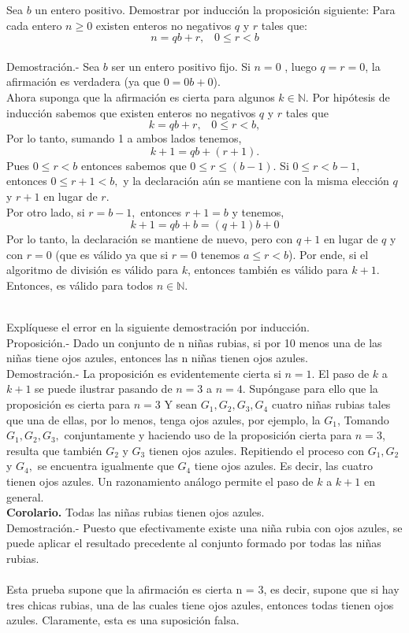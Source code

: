 \begin{ej}
Sea $b$ un entero positivo. Demostrar por inducción la proposición siguiente: Para cada entero $n\geq 0$ existen enteros no negativos $q$ \; y \; $r$ tales que:
$$n=qb+r, \; \; \; 0\leq r < b$$ \\
Demostración.- \; Sea $b$ ser un entero positivo fijo. Si $n=0$ , luego $q=r=0$, la afirmación es verdadera (ya que $0=0b+0$).\\
Ahora suponga que la afirmación es cierta para algunos $k \in \mathbb{N}$. Por hipótesis de inducción sabemos que existen enteros no negativos $q$ \; y \; $r$ tales que $$k=qb+r, \; \; \; 0\leq r < b,$$ Por lo tanto, sumando 1 a ambos lados tenemos, $$k+1=qb+(r+1).$$ Pues $0\leq r < b$ entonces sabemos que $0\leq r \leq (b-1)$. Si $0\leq r < b-1,$ entonces $0\leq r+1<b,$ y la declaración aún se mantiene con la misma elección $q$ \; y \; $r+1$ en lugar de $r$.\\
Por otro lado, si $r=b-1,$ entonces $r+1=b$ y tenemos, $$k+1=qb+b=(q+1)b+0$$
Por lo tanto, la declaración se mantiene de nuevo, pero con $q+1$ en lugar de $q$ \; y con $r=0$ (que es válido ya que si $r=0$ tenemos $a\leq r < b$). Por ende, si el algoritmo de división es válido para $k$, entonces también es válido para $k+1.$ Entonces, es válido para todos $n \in \mathbb{N}$.\\\\
\end{ej}

\begin{ej}
Explíquese el error en la siguiente demostración por inducción.\\
Proposición.- Dado un conjunto de n niñas rubias, si por 10 menos una de las niñas tiene ojos azules, entonces las n niñas tienen ojos azules.\\
Demostración.-\; La proposición es evidentemente cierta si $n = 1$. El paso de $k$ a $k + 1$ se puede ilustrar pasando de $n = 3$ a $n = 4$. Supóngase para ello que la proposición es cierta para $n=3$ Y sean $G_1, G_2, G_3, G_4$ cuatro niñas rubias tales que una de ellas, por lo menos, tenga ojos azules, por ejemplo, la $G_1$, Tomando $G_1,G_2, G_3,$ conjuntamente y haciendo uso de la proposición cierta para $n =3$, resulta que también $G_2$ y $G_3$ tienen ojos azules. Repitiendo el proceso con $G_1, G_2$ y $G_4,$ se encuentra igualmente que $G_4$ tiene ojos azules. Es decir, las cuatro tienen ojos azules. Un razonamiento análogo permite el paso de $k$ a $k + 1$ en general.\\
\textbf{Corolario.} Todas las niñas rubias tienen ojos azules.\\
Demostración.- \; Puesto que efectivamente existe una niña rubia con ojos azules, se puede aplicar el resultado precedente al conjunto formado por todas las niñas rubias.\\\\
Esta prueba supone que la afirmación es cierta n = 3, es decir, supone que si hay tres chicas rubias, una de las cuales tiene ojos azules, entonces todas tienen ojos azules. Claramente, esta es una suposición falsa.\\\\
\end{ej}


